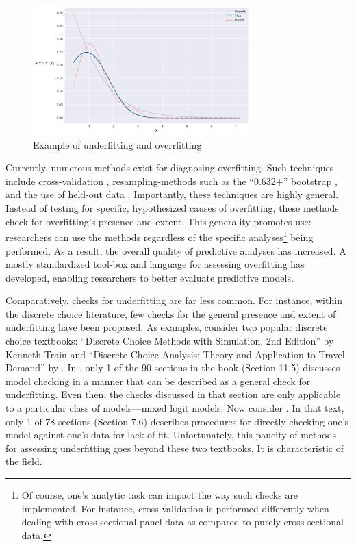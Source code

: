 \documentclass[preprint]{elsarticle}
\begin{document}
\begin{figure}
\centering
\includegraphics[width=0.75\textwidth]{underfitting_example}
\caption{Example of underfitting and overrfitting}
\label{fig:underfitting}
\end{figure}

Currently, numerous methods exist for diagnosing overfitting. Such techniques include cross-validation \citep{stone_cross_1974}, resampling-methods such as the ``0.632+'' bootstrap \citep{efron_improvements_1997}, and the use of held-out data \citep{steckel_cross_1993}. Importantly, these techniques are highly general. Instead of testing for specific, hypothesized causes of overfitting, these methods check for overfitting's presence and extent. This generality promotes use: researchers can use the methods regardless of the specific analyses\footnote{Of course, one's analytic task can impact the way such checks are implemented. For instance, cross-validation is performed differently when dealing with cross-sectional panel data as compared to purely cross-sectional data.} being performed. As a result, the overall quality of predictive analyses has increased. A mostly standardized tool-box and language for assessing overfitting has developed, enabling researchers to better evaluate predictive models.

Comparatively, checks for underfitting are far less common. For instance, within the discrete choice literature, few checks for the general presence and extent of underfitting have been proposed. As examples, consider two popular discrete choice textbooks: ``Discrete Choice Methods with Simulation, 2nd Edition'' by Kenneth Train \citeyearpar{train_discrete_2009} and ``Discrete Choice Analysis: Theory and Application to Travel Demand'' by \citet*{ben-akiva_discrete_1985}. In \citet{train_discrete_2009}, only 1 of the 90 sections in the book (Section 11.5) discusses model checking in a manner that can be described as a general check for underfitting. Even then, the checks discussed in that section are only applicable to a particular class of models---mixed logit models. Now consider \citet{ben-akiva_discrete_1985}. In that text, only 1 of 78 sections (Section 7.6) describes procedures for directly checking one's model against one's data for lack-of-fit. Unfortunately, this paucity of methods for assessing underfitting goes beyond these two textbooks. It is characteristic of the field.
\end{document}
